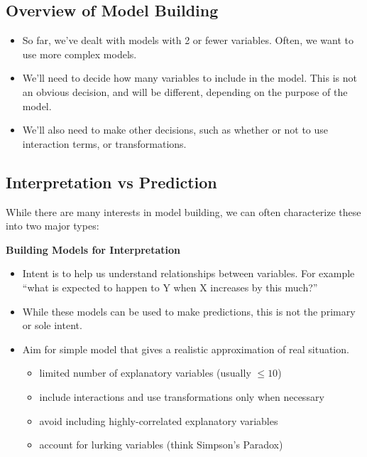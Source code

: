 \documentclass[]{book}
\providecommand{\tightlist}{%
  \setlength{\itemsep}{0pt}\setlength{\parskip}{0pt}}
\begin{document}
\subsection{Overview of Model
Building}\label{overview-of-model-building}

\begin{itemize}
\item
  So far, we've dealt with models with 2 or fewer variables. Often, we
  want to use more complex models.
\item
  We'll need to decide how many variables to include in the model. This
  is not an obvious decision, and will be different, depending on the
  purpose of the model.
\item
  We'll also need to make other decisions, such as whether or not to use
  interaction terms, or transformations.
\end{itemize}

\subsection{Interpretation vs
Prediction}\label{interpretation-vs-prediction}

While there are many interests in model building, we can often
characterize these into two major types:

\textbf{Building Models for Interpretation}

\begin{itemize}
\tightlist
\item
  Intent is to help us understand relationships between variables. For
  example ``what is expected to happen to Y when X increases by this
  much?''\\
\item
  While these models can be used to make predictions, this is not the
  primary or sole intent.\\
\item
  Aim for simple model that gives a realistic approximation of real
  situation.

  \begin{itemize}
  \tightlist
  \item
    limited number of explanatory variables (usually \(\leq 10\))\\
  \item
    include interactions and use transformations only when necessary\\
  \item
    avoid including highly-correlated explanatory variables\\
  \item
    account for lurking variables (think Simpson's Paradox)
  \end{itemize}
\end{itemize}
\end{document}
